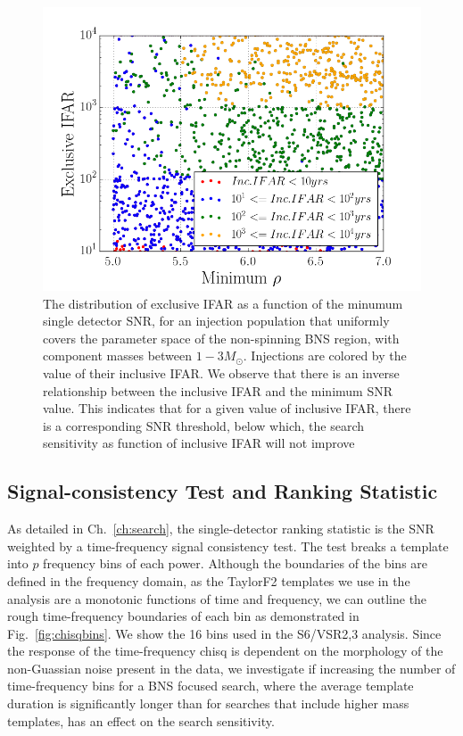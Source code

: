 \begin{figure}
\centering
\includegraphics[width=1.0\textwidth]{papers/bns_o1_dev/figures/ifarifar.png}
\caption{\label{fig:ifarifar} 
The distribution of exclusive IFAR as a function of the minumum single detector SNR, for an injection population that uniformly covers the parameter space of the non-spinning BNS region, with component masses between $1- 3M_\odot$. Injections are colored by the value of their inclusive IFAR. We observe that there is an inverse relationship between the inclusive IFAR and the minimum SNR value. This indicates that for a given value of inclusive IFAR, there is a corresponding SNR threshold, below which, the search sensitivity as function of inclusive IFAR will not improve
}
\end{figure}


\subsection{Signal-consistency Test and Ranking Statistic}
\label{sec:chisq}

As detailed in Ch.~\ref{ch:search}, the single-detector ranking statistic is the SNR weighted by a time-frequency signal consistency test. The test breaks a template into $p$  frequency bins of each power. Although the boundaries of the bins are defined in the frequency domain, as the TaylorF2 templates we use in the analysis are a monotonic functions of time and frequency, we can outline the rough time-frequency boundaries of each bin as demonstrated in Fig.~\ref{fig:chisqbins}. We show the 16 bins used in the S6/VSR2,3 analysis. Since the response of the time-frequency chisq is dependent on the morphology of the non-Guassian noise present in the data, we investigate if increasing the number of time-frequency bins for a BNS focused search, where the average template duration is significantly longer than for searches that include higher mass templates, has an effect on the search sensitivity.

